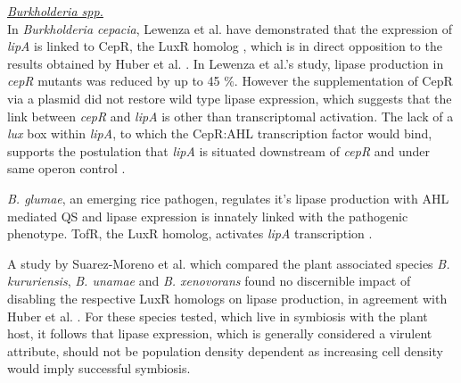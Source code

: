 \documentclass{article}
\begin{document}
\emph{\underline{Burkholderia spp.}} 
\\In \emph{Burkholderia cepacia}, Lewenza et al. have demonstrated that the expression of \emph{lipA} is linked to CepR, the LuxR homolog \cite{lewenza1999}, which is in direct opposition to the results obtained by Huber et al. \cite{huber2001}. In Lewenza et al.'s study, lipase production in \emph{cepR} mutants was reduced by up to 45 \%. However the supplementation of CepR via a plasmid did not restore wild type lipase expression, which suggests that the link between \emph{cepR} and \emph{lipA} is other than transcriptomal activation. The lack of a \emph{lux} box within \emph{lipA}, to which the CepR:AHL transcription factor would bind, supports the postulation that \emph{lipA} is situated downstream of \emph{cepR} and under same operon control \cite{lewenza1999}. 



\emph{B. glumae}, an emerging rice pathogen, regulates it's lipase production with AHL mediated QS and lipase expression is innately linked with the pathogenic phenotype. TofR, the LuxR homolog, activates \emph{lipA} transcription \cite{devescovi_07}. 


A study by Suarez-Moreno et al. which compared the plant associated species \emph{B. kururiensis}, \emph{B. unamae} and \emph{B. xenovorans} found no discernible impact of disabling the respective LuxR homologs on lipase production, in agreement with Huber et al. \cite{huber2001,suarez2010}. For these species tested, which live in symbiosis with the plant host, it follows that lipase expression, which is generally considered a virulent attribute, should not be population density dependent as increasing cell density would imply successful symbiosis. 
\end{document}
